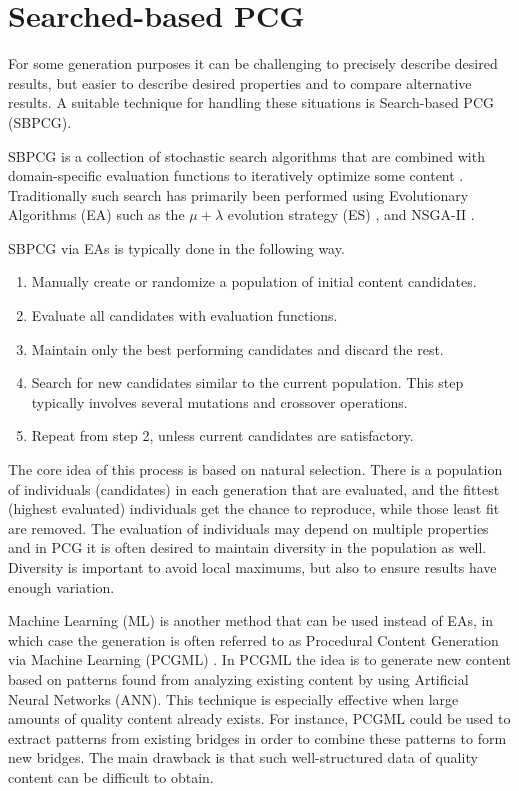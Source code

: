 \section{Searched-based PCG}

For some generation purposes it can be challenging to precisely describe desired results, but easier to describe desired properties and to compare alternative results.
A suitable technique for handling these situations is Search-based PCG (SBPCG).

SBPCG is a collection of stochastic search algorithms that are combined with domain-specific evaluation functions to iteratively optimize some content \cite{search_based_pcg} \cite{search_based_pcg2}.
Traditionally such search has primarily been performed using Evolutionary Algorithms (EA) such as the $\mu + \lambda$ evolution strategy (ES) \cite[p.18-20]{pcg_in_games}, and NSGA-II \cite{nsgaii}.

SBPCG via EAs is typically done in the following way.
\begin{enumerate}
  \item Manually create or randomize a population of initial content candidates.
  \item Evaluate all candidates with evaluation functions.
  \item Maintain only the best performing candidates and discard the rest.
  \item Search for new candidates similar to the current population. This step typically involves several mutations and crossover operations.
  \item Repeat from step 2, unless current candidates are satisfactory.
\end{enumerate}

The core idea of this process is based on natural selection.
There is a population of individuals (candidates) in each generation that are evaluated, and the fittest (highest evaluated) individuals get the chance to reproduce, while those least fit are removed.
The evaluation of individuals may depend on multiple properties and in PCG it is often desired to maintain diversity in the population as well.
Diversity is important to avoid local maximums, but also to ensure results have enough variation.

Machine Learning (ML) is another method that can be used instead of EAs, in which case the generation is often referred to as Procedural Content Generation via Machine Learning (PCGML) \cite{pcgml} \cite{pcgml2} \cite{pcgml3}.
In PCGML the idea is to generate new content based on patterns found from analyzing existing content by using Artificial Neural Networks (ANN).
This technique is especially effective when large amounts of quality content already exists.
For instance, PCGML could be used to extract patterns from existing bridges in order to combine these patterns to form new bridges.
The main drawback is that such well-structured data of quality content can be difficult to obtain.

